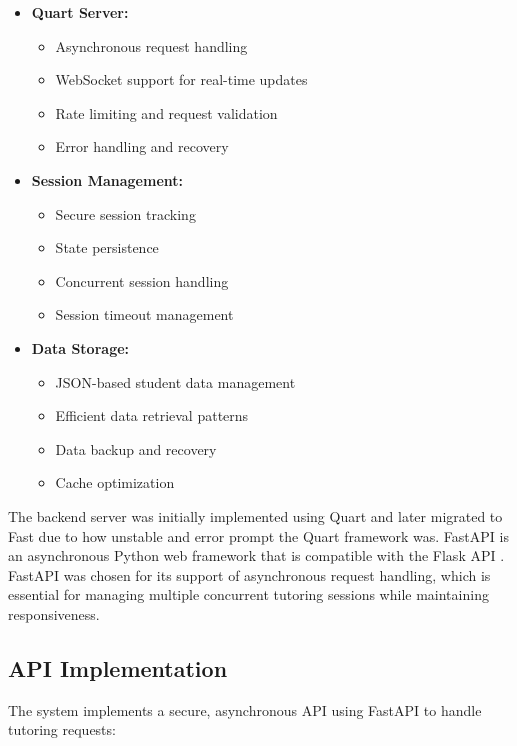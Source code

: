 \begin{itemize}
  \item \textbf{Quart Server:} 
    \begin{itemize}
      \item Asynchronous request handling
      \item WebSocket support for real-time updates
      \item Rate limiting and request validation
      \item Error handling and recovery
    \end{itemize}
  
  \item \textbf{Session Management:} 
    \begin{itemize}
      \item Secure session tracking
      \item State persistence
      \item Concurrent session handling
      \item Session timeout management
    \end{itemize}
  
  \item \textbf{Data Storage:} 
    \begin{itemize}
      \item JSON-based student data management
      \item Efficient data retrieval patterns
      \item Data backup and recovery
      \item Cache optimization
    \end{itemize}
\end{itemize}

The backend server was initially implemented using Quart and later migrated to Fast due to how unstable and error prompt the Quart framework was. FastAPI is an asynchronous Python web framework that is compatible with the Flask API \cite{pallets2024quart}. FastAPI was chosen for its support of asynchronous request handling, which is essential for managing multiple concurrent tutoring sessions while maintaining responsiveness.

\subsection{API Implementation}
\label{subsec:api-implementation}

The system implements a secure, asynchronous API using FastAPI to handle tutoring requests:

